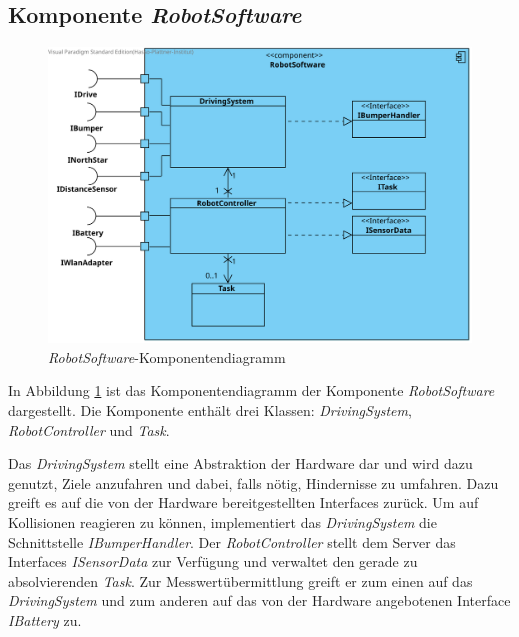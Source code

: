 \subsection{Komponente \textit{RobotSoftware}}
\begin{figure}[H]
\centering
\includegraphics[width=1\textwidth]{img/1-Entwurf-5-RobotSoftware}
\caption{\emph{RobotSoftware}-Komponentendiagramm}
\label{KomponentenStruktur2}
\end{figure}
In Abbildung \ref{KomponentenStruktur2} ist das Komponentendiagramm der Komponente \textit{RobotSoftware} dargestellt. Die Komponente enthält drei Klassen: \textit{DrivingSystem}, \textit{RobotController} und \textit{Task}.


Das \textit{DrivingSystem} stellt eine Abstraktion der Hardware dar und wird dazu genutzt, Ziele anzufahren und dabei,
falls nötig, Hindernisse zu umfahren. Dazu greift es auf die von der Hardware bereitgestellten Interfaces zurück.
Um auf Kollisionen reagieren zu können, implementiert das \textit{DrivingSystem} die Schnittstelle \textit{IBumperHandler}.
Der \textit{RobotController} stellt dem Server das Interfaces \textit{ISensorData} zur Verfügung und verwaltet den gerade
zu absolvierenden \emph{Task}. Zur Messwertübermittlung greift er zum einen auf das \textit{DrivingSystem} und zum anderen auf das
von der Hardware angebotenen Interface \textit{IBattery} zu.
